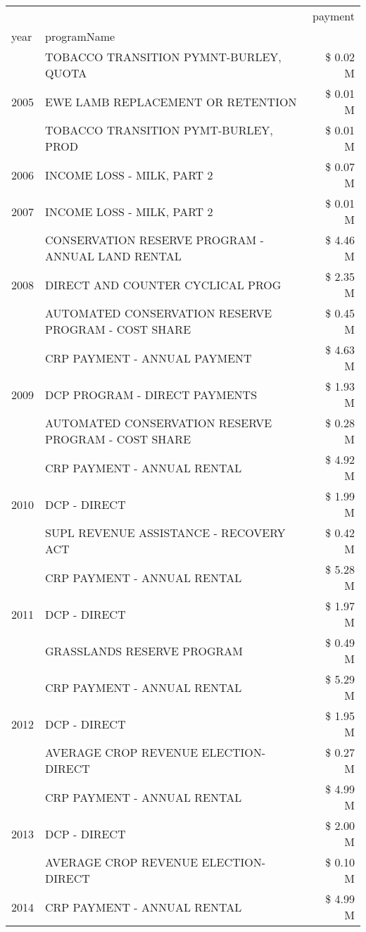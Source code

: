 \begin{tabular}{llr}
\toprule
 &  & payment \\
year & programName &  \\
\midrule
\multirow[t]{3}{*}{2005} & TOBACCO TRANSITION PYMNT-BURLEY, QUOTA & \$ 0.02 M \\
 & EWE LAMB REPLACEMENT OR RETENTION & \$ 0.01 M \\
 & TOBACCO TRANSITION PYMT-BURLEY, PROD & \$ 0.01 M \\
\cline{1-3}
2006 & INCOME LOSS - MILK, PART 2 & \$ 0.07 M \\
\cline{1-3}
2007 & INCOME LOSS - MILK, PART 2 & \$ 0.01 M \\
\cline{1-3}
\multirow[t]{3}{*}{2008} & CONSERVATION RESERVE PROGRAM - ANNUAL LAND RENTAL & \$ 4.46 M \\
 & DIRECT AND COUNTER CYCLICAL PROG & \$ 2.35 M \\
 & AUTOMATED CONSERVATION RESERVE PROGRAM - COST SHARE & \$ 0.45 M \\
\cline{1-3}
\multirow[t]{3}{*}{2009} & CRP PAYMENT - ANNUAL PAYMENT & \$ 4.63 M \\
 & DCP PROGRAM - DIRECT PAYMENTS & \$ 1.93 M \\
 & AUTOMATED CONSERVATION RESERVE PROGRAM - COST SHARE & \$ 0.28 M \\
\cline{1-3}
\multirow[t]{3}{*}{2010} & CRP PAYMENT - ANNUAL RENTAL & \$ 4.92 M \\
 & DCP - DIRECT & \$ 1.99 M \\
 & SUPL REVENUE ASSISTANCE - RECOVERY ACT & \$ 0.42 M \\
\cline{1-3}
\multirow[t]{3}{*}{2011} & CRP PAYMENT - ANNUAL RENTAL & \$ 5.28 M \\
 & DCP - DIRECT & \$ 1.97 M \\
 & GRASSLANDS RESERVE PROGRAM & \$ 0.49 M \\
\cline{1-3}
\multirow[t]{3}{*}{2012} & CRP PAYMENT - ANNUAL RENTAL & \$ 5.29 M \\
 & DCP - DIRECT & \$ 1.95 M \\
 & AVERAGE CROP REVENUE ELECTION-DIRECT & \$ 0.27 M \\
\cline{1-3}
\multirow[t]{3}{*}{2013} & CRP PAYMENT - ANNUAL RENTAL & \$ 4.99 M \\
 & DCP - DIRECT & \$ 2.00 M \\
 & AVERAGE CROP REVENUE ELECTION-DIRECT & \$ 0.10 M \\
\cline{1-3}
\multirow[t]{3}{*}{2014} & CRP PAYMENT - ANNUAL RENTAL & \$ 4.99 M \\

\end{tabular}

